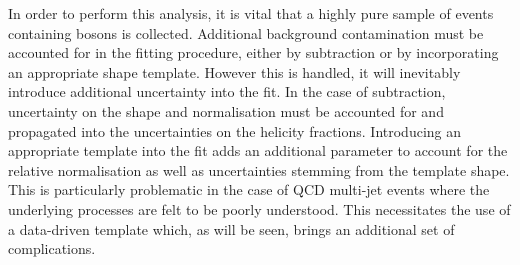 In order to perform this analysis, it is vital that a highly pure sample of
events containing \PW bosons is collected. Additional background contamination
must be accounted for in the fitting procedure, either by subtraction or by
incorporating an appropriate shape template. However this is handled, it will
inevitably introduce additional uncertainty into the fit. In the case of
subtraction, uncertainty on the shape and normalisation must be accounted for
and propagated into the uncertainties on the helicity fractions. Introducing an
appropriate template into the fit adds an additional parameter to account for
the relative normalisation as well as uncertainties stemming from the template
shape. This is particularly problematic in the case of \ac{QCD} multi-jet events
where the underlying processes are felt to be poorly understood. This
necessitates the use of a data-driven template which, as will be seen, brings an
additional set of complications.


